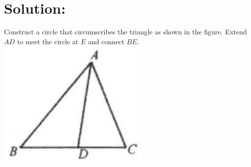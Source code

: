 \documentclass[10pt]{article}
\begin{document}
\section*{Solution:}
Construct a circle that circumscribes the triangle as shown in the figure. Extend \(A D\) to meet the circle at \(E\) and connect \(B E\).\\
\includegraphics[max width=\textwidth, center]{2025_04_17_97bc1f7e44d93c271a88g-196}
\end{document}
